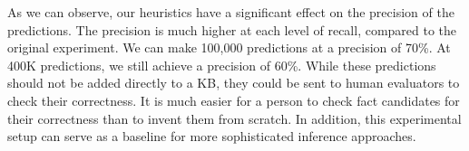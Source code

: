 As we can observe, our heuristics have a significant effect on the precision of the predictions.
The precision is much higher at each level of recall, compared to the original experiment.
We can make 100,000 predictions at a precision of 70\%. At 400K predictions, we still achieve a precision of 60\%.
While these predictions should not be added directly to a KB, they could be sent to human evaluators to check their correctness.
It is much easier for a person to check fact candidates for their correctness than to invent them from scratch.
In addition, this experimental setup can serve as a baseline for more sophisticated inference approaches.



%
%

